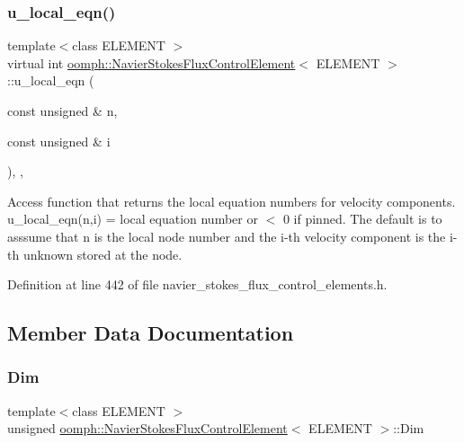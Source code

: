 \subsubsection{\texorpdfstring{u\+\_\+local\+\_\+eqn()}{u\_local\_eqn()}}
{\footnotesize\ttfamily template$<$class E\+L\+E\+M\+E\+NT $>$ \\
virtual int \hyperlink{classoomph_1_1NavierStokesFluxControlElement}{oomph\+::\+Navier\+Stokes\+Flux\+Control\+Element}$<$ E\+L\+E\+M\+E\+NT $>$\+::u\+\_\+local\+\_\+eqn (\begin{DoxyParamCaption}\item[{const unsigned \&}]{n,  }\item[{const unsigned \&}]{i }\end{DoxyParamCaption})\hspace{0.3cm}{\ttfamily [inline]}, {\ttfamily [protected]}, {\ttfamily [virtual]}}



Access function that returns the local equation numbers for velocity components. u\+\_\+local\+\_\+eqn(n,i) = local equation number or $<$ 0 if pinned. The default is to asssume that n is the local node number and the i-\/th velocity component is the i-\/th unknown stored at the node. 



Definition at line 442 of file navier\+\_\+stokes\+\_\+flux\+\_\+control\+\_\+elements.\+h.



\subsection{Member Data Documentation}
\mbox{\label{classoomph_1_1NavierStokesFluxControlElement_a6ae17dbe81d09caf9e65e729254474b6}} 
\subsubsection{\texorpdfstring{Dim}{Dim}}
{\footnotesize\ttfamily template$<$class E\+L\+E\+M\+E\+NT $>$ \\
unsigned \hyperlink{classoomph_1_1NavierStokesFluxControlElement}{oomph\+::\+Navier\+Stokes\+Flux\+Control\+Element}$<$ E\+L\+E\+M\+E\+NT $>$\+::Dim\hspace{0.3cm}{\ttfamily [protected]}}



